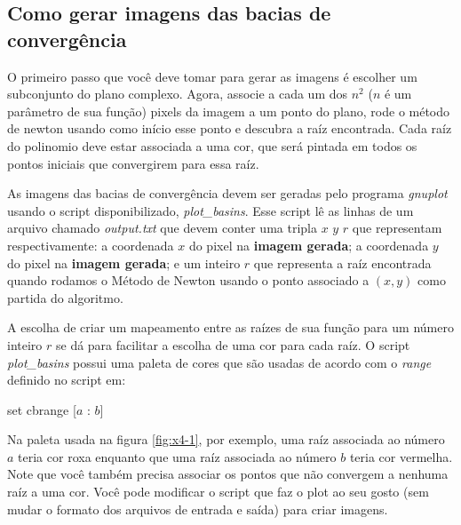 \documentclass[12pt]{article}
\begin{document}
\subsection{Como gerar imagens das bacias de convergência}
O primeiro passo que você deve tomar para gerar as imagens é escolher
um subconjunto do plano complexo. Agora, associe a cada um dos $n^2$
($n$ é um parâmetro de sua função) pixels da imagem a um ponto do 
plano, rode o método de newton usando como início esse ponto e
descubra a raíz encontrada. Cada raíz do polinomio deve estar associada
a uma cor, que será pintada em todos os pontos iniciais que convergirem
para essa raíz.

As imagens das bacias de convergência devem ser geradas pelo programa
{\em gnuplot} usando o script disponibilizado, {\em plot\_basins}. Esse
script lê as linhas de um arquivo chamado {\em output.txt} que devem
conter uma tripla $x$ $y$ $r$ que representam respectivamente: a 
coordenada $x$ do pixel na \textbf{imagem gerada}; a coordenada $y$ do
pixel na \textbf{imagem gerada}; e um inteiro $r$ que representa a raíz
encontrada quando rodamos o Método de Newton usando o ponto associado a
$(x, y)$ como partida do algoritmo.

A escolha de criar um mapeamento entre as raízes de sua função para um
número inteiro $r$ se dá para facilitar a escolha de uma cor para cada
raíz. O script {\em plot\_basins} possui uma paleta de cores que
são usadas de acordo com o {\em range} definido no script em:
\begin{center}
    set cbrange [$a$ : $b$]
\end{center}
Na paleta usada na figura \ref{fig:x4-1}, por exemplo, uma raíz 
associada ao número $a$ teria cor roxa enquanto que uma raíz associada
ao número $b$ teria cor vermelha. Note que você também precisa associar
os pontos que não convergem a nenhuma raíz a uma cor. Você pode 
modificar o script que faz o plot ao seu gosto (sem mudar o formato dos
arquivos de entrada e saída) para criar imagens.
\end{document}
